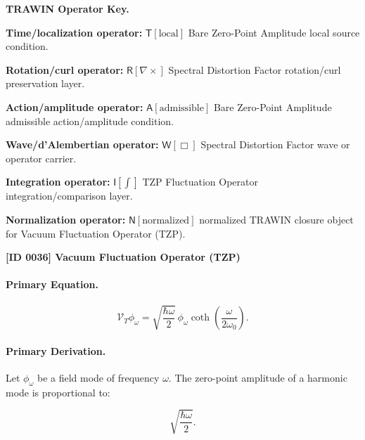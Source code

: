 \par\vspace{0.45\baselineskip}
\noindent\begin{minipage}[t]{\linewidth}
\begingroup
\small
\raggedright
\textbf{TRAWIN Operator Key.}\par
\noindent\textbf{Time/localization operator:} $\mathsf{T}\!\left[\mathrm{local}\right]$ Bare Zero-Point Amplitude local source condition.\par
\noindent\textbf{Rotation/curl operator:} $\mathsf{R}\!\left[\nabla\times\right]$ Spectral Distortion Factor rotation/curl preservation layer.\par
\noindent\textbf{Action/amplitude operator:} $\mathsf{A}\!\left[\mathrm{admissible}\right]$ Bare Zero-Point Amplitude admissible action/amplitude condition.\par
\noindent\textbf{Wave/d'Alembertian operator:} $\mathsf{W}\!\left[\Box\right]$ Spectral Distortion Factor wave or operator carrier.\par
\noindent\textbf{Integration operator:} $\mathsf{I}\!\left[\int\right]$ TZP Fluctuation Operator integration/comparison layer.\par
\noindent\textbf{Normalization operator:} $\mathsf{N}\!\left[\mathrm{normalized}\right]$ normalized TRAWIN closure object for Vacuum Fluctuation Operator (TZP).\par
\endgroup
\end{minipage}

\clearpage
\noindent\textbf{[ID 0036] Vacuum Fluctuation Operator (TZP)}\par
\vspace{0.35em}
\paragraph{Primary Equation.}
\begin{equation}
\mathcal{V}_T\phi_{\omega}
=
\sqrt{
\frac{\hbar\omega}{2}
}
\,\phi_{\omega}
\coth\left(
\frac{\omega}{2\omega_0}
\right).
\end{equation}

\paragraph{Primary Derivation.}
Let $\phi_{\omega}$ be a field mode of frequency $\omega$.  
The zero-point amplitude of a harmonic mode is proportional to:

\begin{equation}
\sqrt{\frac{\hbar\omega}{2}} .
\end{equation}

